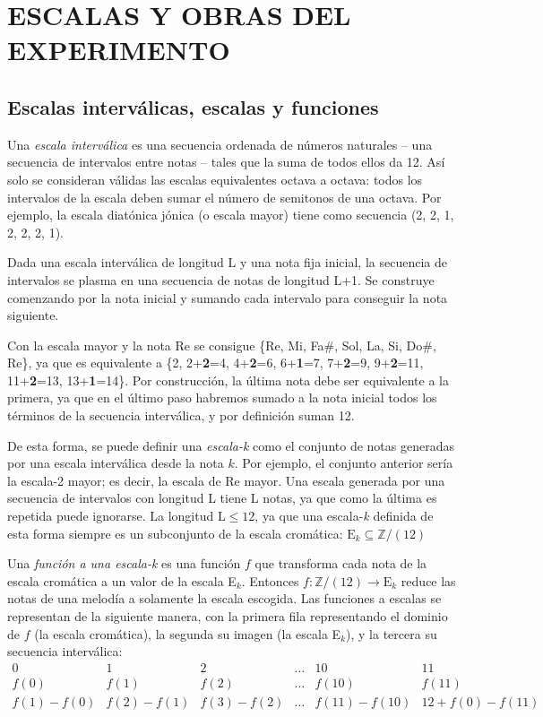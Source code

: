 	\chapter{ESCALAS Y OBRAS DEL EXPERIMENTO}
		
	\section{Escalas interválicas, escalas y funciones}
	
		Una \textit{escala interválica} es una secuencia ordenada de números naturales -- una secuencia de intervalos entre notas -- tales que la suma de todos ellos da 12. Así solo se consideran válidas las escalas equivalentes octava a octava: todos los intervalos de la escala deben sumar el número de semitonos de una octava. Por ejemplo, la escala diatónica jónica (o escala mayor) tiene como secuencia (2, 2, 1, 2, 2, 2, 1).
		
		Dada una escala interválica de longitud L y una nota fija inicial, la secuencia de intervalos se plasma en una secuencia de notas de longitud L+1. Se construye comenzando por la nota inicial y sumando cada intervalo para conseguir la nota siguiente. 
		
		Con la escala mayor y la nota Re se consigue \{Re, Mi, Fa$\#$, Sol, La, Si, Do$\#$, Re\}, ya que es equivalente a \{2, 2+\textbf{2}=4, 4+\textbf{2}=6, 6+\textbf{1}=7, 7+\textbf{2}=9, 9+\textbf{2}=11, 11+\textbf{2}=13, 13+\textbf{1}=14\}. Por construcción, la última nota debe ser equivalente a la primera, ya que en el último paso habremos sumado a la nota inicial todos los términos de la secuencia interválica, y por definición suman 12.
		
		De esta forma, se puede definir una \textit{escala-k} como el conjunto de notas generadas por una escala interválica desde la nota $k$. Por ejemplo, el conjunto anterior sería la escala-2 mayor; es decir, la escala de Re mayor. Una escala generada por una secuencia de intervalos con longitud L tiene L notas, ya que como la última es repetida puede ignorarse. La longitud $\text{L}\leq 12$, ya que una escala-\textit{k} definida de esta forma siempre es un subconjunto de la escala cromática: $\text{E}_k\subseteq\mathbb{Z}/(12)$
		
		Una \textit{función a una escala-k} es una función $f$ que transforma cada nota de la escala cromática a un valor de la escala E$_k$. Entonces $f : \mathbb{Z}/(12) \rightarrow \text{E}_k$ reduce las notas de una melodía a solamente la escala escogida. Las funciones a escalas se representan de la siguiente manera, con la primera fila representando el dominio de $f$ (la escala cromática), la segunda su imagen (la escala E$_k$), y la tercera su secuencia interválica:
		$$\left.\begin{matrix}
		0&1&2&\ldots&10&11\\
		f(0)&f(1)&f(2)&\ldots&f(10)&f(11)\\
		f(1)-f(0)&f(2)-f(1)&f(3)-f(2)&\ldots&f(11)-f(10)&12+f(0)-f(11)
		\end{matrix}\right.$$
		

